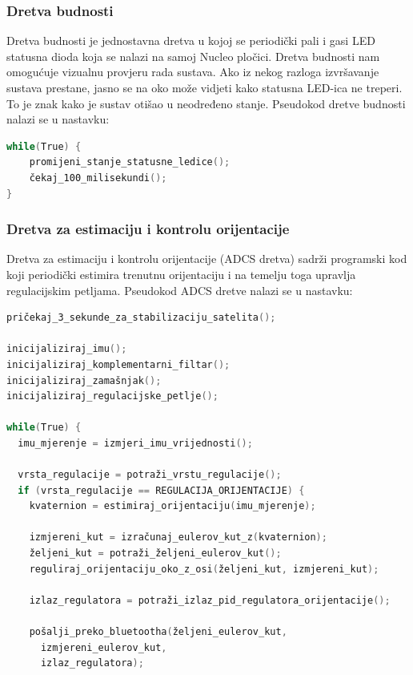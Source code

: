 \documentclass[times, utf8, diplomski, numeric]{templates/template}
\begin{document}
{{{            \subsubsection{Dretva budnosti}{
                Dretva budnosti je jednostavna dretva u kojoj se periodički pali i gasi LED statusna dioda koja se nalazi na samoj Nucleo pločici. Dretva budnosti nam omogućuje vizualnu provjeru rada sustava. Ako iz nekog razloga izvršavanje sustava prestane, jasno se na oko može vidjeti kako statusna LED-ica ne treperi. To je znak kako je sustav otišao u neodređeno stanje. Pseudokod dretve budnosti nalazi se u nastavku:

                \begin{lstlisting}[language=C]
while(True) {
    promijeni_stanje_statusne_ledice();
    čekaj_100_milisekundi();
}               \end{lstlisting}
            }
    
            \subsubsection{Dretva za estimaciju i kontrolu orijentacije}{
                Dretva za estimaciju i kontrolu orijentacije (ADCS dretva) sadrži programski kod koji periodički estimira trenutnu orijentaciju i na temelju toga upravlja regulacijskim petljama. Pseudokod ADCS dretve nalazi se u nastavku:
        
                \begin{lstlisting}[language=C]
pričekaj_3_sekunde_za_stabilizaciju_satelita();

inicijaliziraj_imu();
inicijaliziraj_komplementarni_filtar();
inicijaliziraj_zamašnjak();
inicijaliziraj_regulacijske_petlje();

while(True) {
  imu_mjerenje = izmjeri_imu_vrijednosti();

  vrsta_regulacije = potraži_vrstu_regulacije();
  if (vrsta_regulacije == REGULACIJA_ORIJENTACIJE) {
    kvaternion = estimiraj_orijentaciju(imu_mjerenje);

    izmjereni_kut = izračunaj_eulerov_kut_z(kvaternion);
    željeni_kut = potraži_željeni_eulerov_kut();
    reguliraj_orijentaciju_oko_z_osi(željeni_kut, izmjereni_kut);

    izlaz_regulatora = potraži_izlaz_pid_regulatora_orijentacije();

    pošalji_preko_bluetootha(željeni_eulerov_kut, 
      izmjereni_eulerov_kut, 
      izlaz_regulatora);


\end{lstlisting}}}}}
\end{document}
